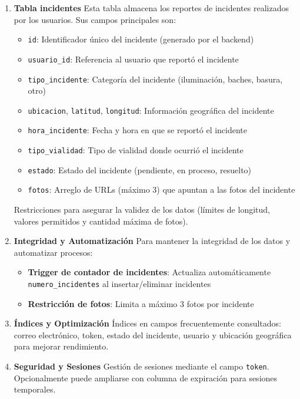 \begin{enumerate}
    \item \textbf{Tabla incidentes}
    Esta tabla almacena los reportes de incidentes realizados por los usuarios. Sus campos principales son:
    \begin{itemize}
        \item \texttt{id}: Identificador único del incidente \hfill (generado por el backend)
        \item \texttt{usuario\_id}: Referencia al usuario que reportó el incidente
        \item \texttt{tipo\_incidente}: Categoría del incidente \hfill (iluminación, baches, basura, otro)
        \item \texttt{ubicacion}, \texttt{latitud}, \texttt{longitud}: Información geográfica del incidente
        \item \texttt{hora\_incidente}: Fecha y hora en que se reportó el incidente
        \item \texttt{tipo\_vialidad}: Tipo de vialidad donde ocurrió el incidente
        \item \texttt{estado}: Estado del incidente \hfill (pendiente, en proceso, resuelto)
        \item \texttt{fotos}: Arreglo de URLs \hfill (máximo 3) que apuntan a las fotos del incidente
    \end{itemize}
    Restricciones para asegurar la validez de los datos (límites de longitud, valores permitidos y cantidad máxima de fotos).

    \item \textbf{Integridad y Automatización}
    Para mantener la integridad de los datos y automatizar procesos:
    \begin{itemize}
        \item \textbf{Trigger de contador de incidentes}: Actualiza automáticamente \texttt{numero\_incidentes} al insertar/eliminar incidentes
        \item \textbf{Restricción de fotos}: Limita a máximo 3 fotos por incidente
    \end{itemize}

    \item \textbf{Índices y Optimización}
    Índices en campos frecuentemente consultados: correo electrónico, token, estado del incidente, usuario y ubicación geográfica para mejorar rendimiento.

    \item \textbf{Seguridad y Sesiones}
    Gestión de sesiones mediante el campo \texttt{token}. Opcionalmente puede ampliarse con columna de expiración para sesiones temporales.
\end{enumerate}

